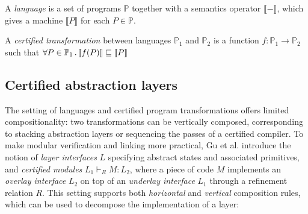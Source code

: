 \begin{definition} \label{def:certified-trans}
A \emph{language} is a set of programs $\mathbb{P}$
together with a semantics operator $\llbracket - \rrbracket$,
which gives a machine $\llbracket P \rrbracket$ for each $P \in \mathbb{P}$.

A \emph{certified transformation} between languages $\mathbb{P}_1$ and $\mathbb{P}_2$
is a function $f : \mathbb{P}_1 \rightarrow \mathbb{P}_2$ such that
$\forall P \in \mathbb{P}_1 \,.\,
\llbracket f(P) \rrbracket \refines \llbracket P \rrbracket$
\end{definition}

\subsection{Certified abstraction layers}
The setting of languages and certified program transformations
offers limited compositionality:
two transformations can be vertically composed,
corresponding to stacking abstraction layers
or sequencing the passes of a certified compiler.
To make modular verification and linking more practical, Gu et
al. \cite{dscal15} introduce the notion of \emph{layer interfaces} $L$
specifying abstract states and associated primitives,
and \emph{certified modules} $L_1 \vdash_R M : L_2$,
where a piece of code $M$
implements an \emph{overlay interface} $L_2$ on top of an
\emph{underlay interface} $L_1$ through a refinement relation $R$.
This setting supports both \emph{horizontal} and \emph{vertical} composition rules,
which can be used to decompose the implementation of a layer:

\vspace{-5pt}
{\small
\begin{mathpar}
\end{mathpar}
\vspace{-5pt}
\begin{mathpar}
\end{mathpar}
\vspace{-5pt}
}%

